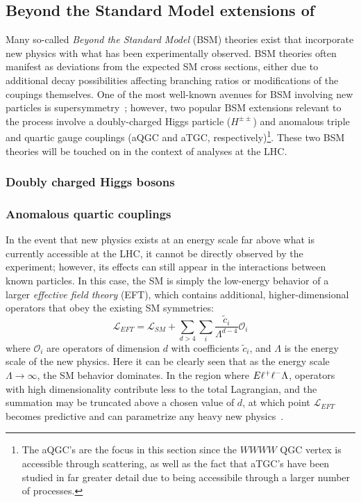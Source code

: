 \subsection{Beyond the Standard Model extensions of \ssww}\label{ssww13tev:extensions}
Many so-called \emph{Beyond the Standard Model} (BSM) theories exist that incorporate new physics with what has been experimentally observed.
BSM theories often manifest as deviations from the expected SM cross sections, either due to additional decay possibilities affecting branching ratios or modifications of the coupings themselves.
One of the most well-known avenues for BSM involving new particles is supersymmetry~\cite{1997.susy-primer}; however, two popular BSM extensions relevant to the \ssww process involve a doubly-charged Higgs particle ($H^{\pm\pm}$) and anomalous triple and quartic gauge couplings (aQGC and aTGC, respectively)\footnote{The aQGC's are the focus in this section since the $WWWW$ QGC vertex is accessible through \sswwnojj scattering, as well as the fact that aTGC's have been studied in far greater detail due to being accessibile through a larger number of processes.}.
These two BSM theories will be touched on in the context of \ssww analyses at the LHC.

\subsubsection{Doubly charged Higgs bosons}\label{ssww13tev:hpp}
\cite{1985.doubly-charged-higgs, 2013.triplet-higgs-lhc}

\subsubsection{Anomalous quartic couplings}\label{ssww13tef:aqgc}
In the event that new physics exists at an energy scale far above what is currently accessible at the LHC, it cannot be directly observed by the experiment; however, its effects can still appear in the interactions between known particles.
In this case, the SM is simply the low-energy behavior of a larger \emph{effective field theory} (EFT), which contains additional, higher-dimensional operators that obey the existing SM symmetries:
\begin{equation}
  \mathcal{L}_{EFT} = \mathcal{L}_{SM}+\sum\limits_{d > 4}\sum\limits_i \frac{\tilde{c}_{i}}{\Lambda^{d-4}}\mathcal{O}_{i}
  \label{eq:eft_lagrangian}
\end{equation}
where $\mathcal{O}_i$ are operators of dimension $d$ with coefficients $\tilde{c}_i$, and $\Lambda$ is the energy scale of the new physics.
Here it can be clearly seen that as the energy scale $\Lambda\rightarrow\infty$, the SM behavior dominates.
In the region where $E\muchless\Lambda$, operators with high dimensionality contribute less to the total Lagrangian, and the summation may be truncated above a chosen value of $d$, at which point $\mathcal{L}_{EFT}$ becomes predictive and can parametrize any heavy new physics~\cite{2013.aqgc-mc}.

